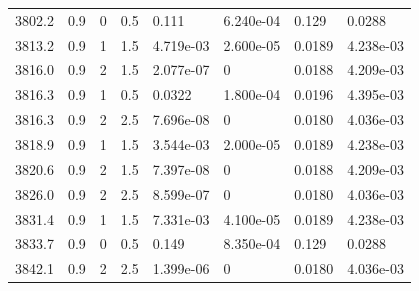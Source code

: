 \documentclass[preview]{standalone}
\begin{document}
{{{{{{{{{{{{{{\begin{tabular}{L{1.2cm}C{1.2cm} C{0.3cm}C{0.5cm} C{1.4cm}C{1.4cm} C{1.4cm}C{1.4cm}}
  3802.2  &   0.9  & 0     & 0.5 &  0.111  & 6.240e-04  & 0.129 &  0.0288   \\ 
  3813.2  &   0.9  & 1     & 1.5 &  4.719e-03  & 2.600e-05  & 0.0189 &  4.238e-03   \\ 
  3816.0  &   0.9  & 2     & 1.5 &  2.077e-07  & 0  & 0.0188 &  4.209e-03   \\ 
  3816.3  &   0.9  & 1     & 0.5 &  0.0322  & 1.800e-04  & 0.0196 &  4.395e-03   \\ 
  3816.3  &   0.9  & 2     & 2.5 &  7.696e-08  & 0  & 0.0180 &  4.036e-03   \\ 
  3818.9  &   0.9  & 1     & 1.5 &  3.544e-03  & 2.000e-05  & 0.0189 &  4.238e-03   \\ 
  3820.6  &   0.9  & 2     & 1.5 &  7.397e-08  & 0  & 0.0188 &  4.209e-03   \\ 
  3826.0  &   0.9  & 2     & 2.5 &  8.599e-07  & 0  & 0.0180 &  4.036e-03   \\ 
  3831.4  &   0.9  & 1     & 1.5 &  7.331e-03  & 4.100e-05  & 0.0189 &  4.238e-03   \\ 
  3833.7  &   0.9  & 0     & 0.5 &  0.149  & 8.350e-04  & 0.129 &  0.0288   \\ 
  3842.1  &   0.9  & 2     & 2.5 &  1.399e-06  & 0  & 0.0180 &  4.036e-03   \\ 
\hline 
\end{tabular} 

}}}}}}}}}}}}}}
\end{document}
